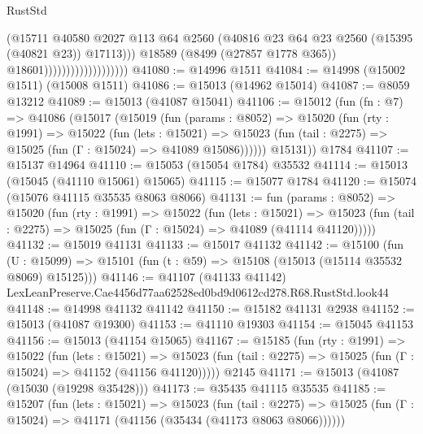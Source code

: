\begin{lexlean}{RustStd}
\begin{coremodule}
                                            (@15711
                                              @40580
                                              @2027
                                              @113
                                              @64
                                              @2560
                                              (@40816
                                                @23
                                                @64
                                                @23
                                                @2560
                                                (@15395 (@40821 @23))
                                                @17113)))
                                          @18589
                                          (@8499 (@27857 @1778 @365))
                                          @18601)))))))))))))))))))
@41080 := @14996 @1511
@41084 := @14998 (@15002 @1511) (@15008 @1511)
@41086 := @15013 (@14962 @15014)
@41087 := @8059 @13212
@41089 := @15013 (@41087 @15041)
@41106 := @15012
    (fun (fn : @7) =>
    @41086
      (@15017
        (@15019
          (fun (params : @8052) =>
          @15020
            (fun (rty : @1991) =>
            @15022
              (fun (lets : @15021) =>
              @15023 (fun (tail : @2275) => @15025 (fun (Γ : @15024) => @41089 @15086))))))
        @15131))
    @1784
@41107 := @15137 @14964
@41110 := @15053 (@15054 @1784) @35532
@41114 := @15013 (@15045 (@41110 @15061) @15065)
@41115 := @15077 @1784
@41120 := @15074 (@15076 @41115 @35535 @8063 @8066)
@41131 := fun (params : @8052) =>
  @15020
    (fun (rty : @1991) =>
    @15022
      (fun (lets : @15021) =>
      @15023 (fun (tail : @2275) => @15025 (fun (Γ : @15024) => @41089 (@41114 @41120)))))
@41132 := @15019 @41131
@41133 := @15017 @41132
@41142 := @15100
    (fun (U : @15099) => @15101 (fun (t : @59) => @15108 (@15013 (@15114 @35532 @8069) @15125)))
@41146 := @41107
    (@41133 @41142)
    LexLeanPreserve.Cae4456d77aa62528ed0bd9d0612cd278.R68.RustStd.look44
@41148 := @14998 @41132 @41142
@41150 := @15182 @41131 @2938
@41152 := @15013 (@41087 @19300)
@41153 := @41110 @19303
@41154 := @15045 @41153
@41156 := @15013 (@41154 @15065)
@41167 := @15185
    (fun (rty : @1991) =>
    @15022
      (fun (lets : @15021) =>
      @15023 (fun (tail : @2275) => @15025 (fun (Γ : @15024) => @41152 (@41156 @41120)))))
    @2145
@41171 := @15013 (@41087 (@15030 (@19298 @35428)))
@41173 := @35435 @41115 @35535
@41185 := @15207
    (fun (lets : @15021) =>
    @15023
      (fun (tail : @2275) =>
      @15025 (fun (Γ : @15024) => @41171 (@41156 (@35434 (@41173 @8063 @8066))))))

\end{coremodule}
\end{lexlean}
